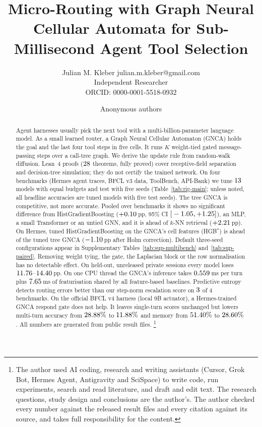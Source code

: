 \documentclass[10pt]{article}
\title{Micro-Routing with Graph Neural Cellular Automata for Sub-Millisecond Agent Tool Selection}
\author{\name Julian M. Kleber \email julian.m.kleber@gmail.com \\
        \addr Independent Researcher \\
        ORCID: 0000-0001-5518-0932}
\author{Anonymous authors}
\begin{document}
\maketitle
\begin{abstract}
        Agent harnesses usually pick the next tool with a multi-billion-parameter language model. As a small learned router, a Graph Neural Cellular Automaton (GNCA) holds the goal and the last four tool steps in five cells. It runs $K$ weight-tied gated message-passing steps over a call-tree graph. We derive the update rule from random-walk diffusion. Lean~4 proofs ($28$ theorems, fully proved) cover receptive-field separation and decision-tree simulation; they do not certify the trained network. On four benchmarks (Hermes agent traces, BFCL v3 data, ToolBench, API-Bank) we tune $13$ models with equal budgets and test with five seeds (Table~\ref{tab:rig-main}; unless noted, all headline accuracies are tuned models with five test seeds). The tree GNCA is competitive, not more accurate. Pooled over benchmarks it shows no significant difference from HistGradientBoosting ($+0.10$\,pp, 95\% CI ${[}-1.05, +1.25{]}$), an MLP, a small Transformer or an untied GNN, and it is ahead of $k$-NN retrieval ($+2.21$\,pp). On Hermes, tuned HistGradientBoosting on the GNCA's cell features (HGB$^\ast$) is ahead of the tuned tree GNCA ($-1.10$\,pp after Holm correction). Default three-seed configurations appear in Supplementary Tables~\ref{tab:sup-multibench} and~\ref{tab:sup-paired}. Removing weight tying, the gate, the Laplacian block or the row normalisation has no detectable effect. On held-out, unreleased private sessions every model loses $11.76$--$14.40$\,pp. On one CPU thread the GNCA's inference takes $0.559$\,ms per turn plus $7.65$\,ms of featurisation shared by all feature-based baselines. Predictive entropy detects routing errors better than our step-norm escalation score on $3$ of 4 benchmarks. On the official BFCL v4 harness (local 9B actuator), a Hermes-trained GNCA respond gate does not help. It leaves single-turn scores unchanged but lowers multi-turn accuracy from $28.88\%$ to $11.88\%$ and memory from $51.40\%$ to $28.60\%$. All numbers are generated from public result files.
    \footnote{The author used AI coding, research and writing assistants (Cursor, Grok Bot, Hermes Agent, Antigravity and SciSpace) to write code, run experiments, search and read literature, and draft and edit text. The research questions, study design and conclusions are the author's. The author checked every number against the released result files and every citation against its source, and takes full responsibility for the content.}
\end{abstract}
\end{document}
